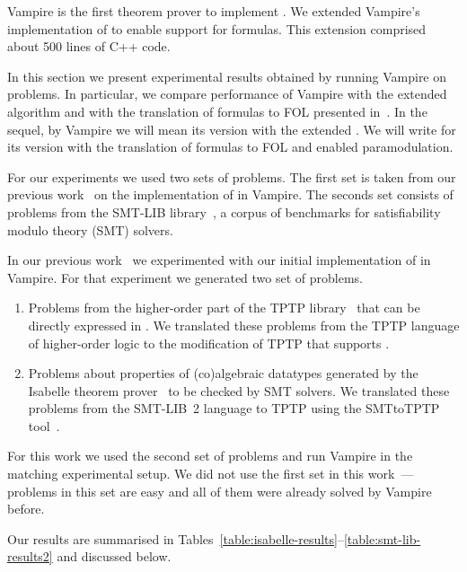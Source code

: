 Vampire is the first theorem prover to implement \newcnf{}. We extended Vampire's implementation of \newcnf{} to enable support for \folb{} formulas. This extension comprised about 500 lines of C++ code. %


In this section we present experimental results obtained by running Vampire on \folb{} problems. In particular, we compare performance of Vampire with the extended \newcnf{} algorithm and with the translation of \folb{} formulas to FOL presented in~\cite{FOOL}. In the sequel, by Vampire we will mean its version with the extended \newcnf{}. We will write \oldcnfVampire{} for its version with the translation of \folb{} formulas to FOL and enabled \folb{} paramodulation.

For our experiments we used two sets of problems. The first set is taken from our previous work~\cite{VampireAndFOOL} on the implementation of \folb{} in Vampire. The seconds set consists of problems from the SMT-LIB library~\cite{SMT-LIB}, a corpus of benchmarks for satisfiability modulo theory (SMT) solvers.

In our previous work~\cite{VampireAndFOOL} we experimented with our initial implementation of \folb{} in Vampire. For that experiment we generated two set of \folb{} problems.
\begin{enumerate}
  \item Problems from the higher-order part of the TPTP library~\cite{TPTP} that can be directly expressed in \folb{}. We translated these problems from the TPTP language of higher-order logic to the modification of TPTP that supports \folb{}.
  \item Problems about properties of (co)algebraic datatypes generated by the Isabelle theorem prover~\cite{Isabelle} to be checked by SMT solvers. We translated these problems from the SMT-LIB~2 language to TPTP using the SMTtoTPTP tool~\cite{SMTLIB2TPTP}.
\end{enumerate}

For this work we used the second set of problems and run Vampire in the matching experimental setup. We did not use the first set in this work~--- problems in this set are easy and all of them were already solved by Vampire before.

Our results are summarised in Tables~\ref{table:isabelle-results}--\ref{table:smt-lib-results2} and discussed below. 

